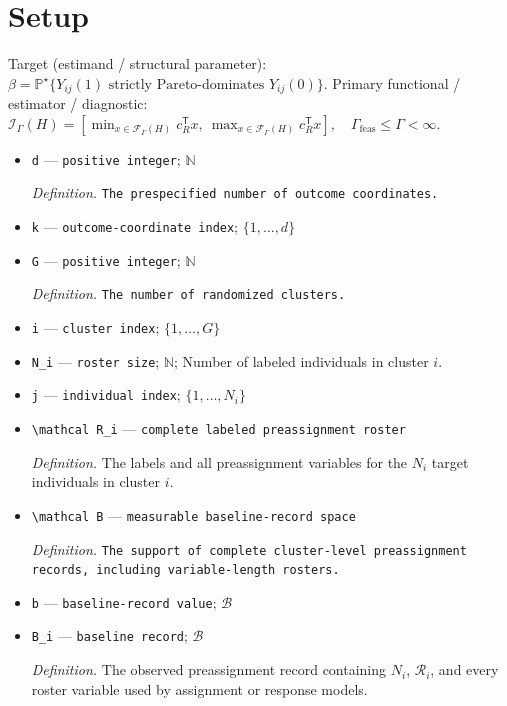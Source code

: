 \documentclass{article}
\begin{document}
\section{Setup}

Target (estimand / structural parameter): \(\beta=\mathbb P^{\star}\{Y_{ij}(1)\text{ strictly Pareto-dominates }Y_{ij}(0)\}\).
Primary functional / estimator / diagnostic: \(\mathcal I_{\Gamma}(H)=[\min_{x\in\mathcal F_{\Gamma}(H)}c_R^{\mathsf T}x,\ \max_{x\in\mathcal F_{\Gamma}(H)}c_R^{\mathsf T}x],\quad \Gamma_{\mathrm{feas}}\le\Gamma<\infty\).
\begin{itemize}
  \item \texttt{d} --- \texttt{positive integer}; \(\mathbb N\)
  \par\smallskip\noindent\emph{Definition.} \texttt{The prespecified number of outcome coordinates.}
  \item \texttt{k} --- \texttt{outcome-\allowbreak{}coordinate index}; \(\{1,\ldots,d\}\)
  \item \texttt{G} --- \texttt{positive integer}; \(\mathbb N\)
  \par\smallskip\noindent\emph{Definition.} \texttt{The number of randomized clusters.}
  \item \texttt{i} --- \texttt{cluster index}; \(\{1,\ldots,G\}\)
  \item \texttt{N\_\allowbreak{}i} --- \texttt{roster size}; \(\mathbb N\); Number of labeled individuals in cluster \(i\).
  \item \texttt{j} --- \texttt{individual index}; \(\{1,\ldots,N_i\}\)
  \item \texttt{\textbackslash{}\allowbreak{}mathcal R\_\allowbreak{}i} --- \texttt{complete labeled preassignment roster}
  \par\smallskip\noindent\emph{Definition.} The labels and all preassignment variables for the \(N_i\) target individuals in cluster \(i\).
  \item \texttt{\textbackslash{}\allowbreak{}mathcal B} --- \texttt{measurable baseline-\allowbreak{}record space}
  \par\smallskip\noindent\emph{Definition.} \texttt{The support of complete cluster-\allowbreak{}level preassignment records,\allowbreak{} including variable-\allowbreak{}length rosters.}
  \item \texttt{b} --- \texttt{baseline-\allowbreak{}record value}; \(\mathcal B\)
  \item \texttt{B\_\allowbreak{}i} --- \texttt{baseline record}; \(\mathcal B\)
  \par\smallskip\noindent\emph{Definition.} The observed preassignment record containing \(N_i\), \(\mathcal R_i\), and every roster variable used by assignment or response models.

\end{itemize}
\end{document}
